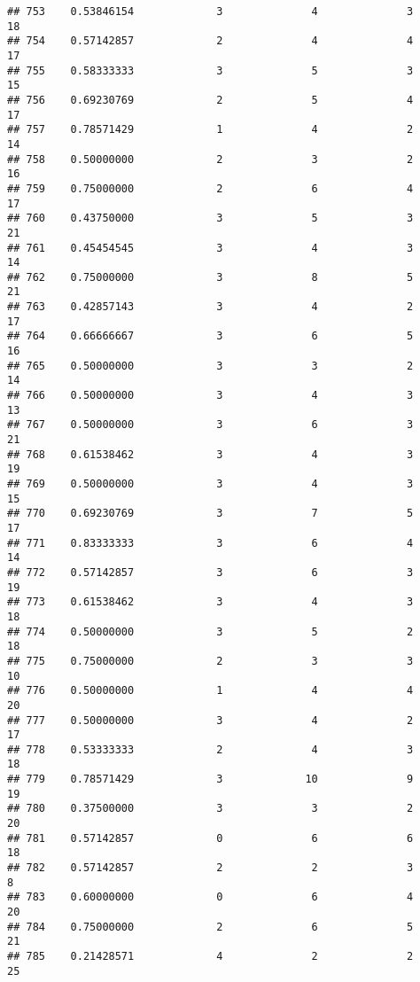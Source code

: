 \documentclass[
]{article}
\begin{document}
\begin{verbatim}
## 753    0.53846154             3              4              3             18
## 754    0.57142857             2              4              4             17
## 755    0.58333333             3              5              3             15
## 756    0.69230769             2              5              4             17
## 757    0.78571429             1              4              2             14
## 758    0.50000000             2              3              2             16
## 759    0.75000000             2              6              4             17
## 760    0.43750000             3              5              3             21
## 761    0.45454545             3              4              3             14
## 762    0.75000000             3              8              5             21
## 763    0.42857143             3              4              2             17
## 764    0.66666667             3              6              5             16
## 765    0.50000000             3              3              2             14
## 766    0.50000000             3              4              3             13
## 767    0.50000000             3              6              3             21
## 768    0.61538462             3              4              3             19
## 769    0.50000000             3              4              3             15
## 770    0.69230769             3              7              5             17
## 771    0.83333333             3              6              4             14
## 772    0.57142857             3              6              3             19
## 773    0.61538462             3              4              3             18
## 774    0.50000000             3              5              2             18
## 775    0.75000000             2              3              3             10
## 776    0.50000000             1              4              4             20
## 777    0.50000000             3              4              2             17
## 778    0.53333333             2              4              3             18
## 779    0.78571429             3             10              9             19
## 780    0.37500000             3              3              2             20
## 781    0.57142857             0              6              6             18
## 782    0.57142857             2              2              3              8
## 783    0.60000000             0              6              4             20
## 784    0.75000000             2              6              5             21
## 785    0.21428571             4              2              2             25

\end{verbatim}
\end{document}

